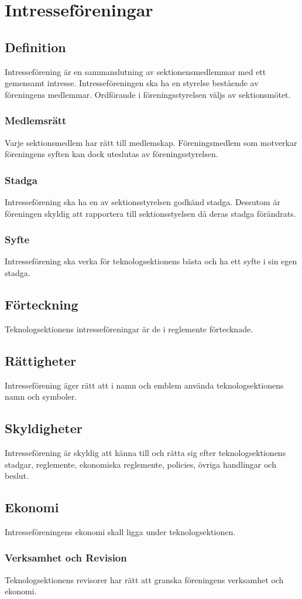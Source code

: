 \section{Intresseföreningar}
\subsection{Definition}
Intresseförening är en sammanslutning av sektionensmedlemmar med ett gemensamt intresse.
Intresseföreningen ska ha en styrelse bestående av föreningens medlemmar.
Ordförande i föreningsstyrelsen väljs av sektionsmötet.
\subsubsection{Medlemsrätt}
Varje sektionsmedlem har rätt till medlemskap.
Föreningsmedlem som motverkar föreningens syften kan dock uteslutas av föreningsstyrelsen.
\subsubsection{Stadga}
Intresseförening ska ha en av sektionsstyrelsen godkänd stadga.
Dessutom är föreningen skyldig att rapportera till sektionsstyelsen då deras stadga förändrats.
\subsubsection{Syfte}
Intresseförening ska verka för teknologsektionens bästa och ha ett syfte i sin egen stadga.
\subsection{Förteckning}
Teknologsektionens intresseföreningar är de i reglemente förtecknade.
\subsection{Rättigheter}
Intresseförening äger rätt att i namn och emblem använda teknologsektionens namn och symboler.
\subsection{Skyldigheter}
Intresseförening är skyldig att känna till och rätta sig efter teknologsektionens stadgar, reglemente, ekonomiska reglemente, policies, övriga handlingar och beslut.
\subsection{Ekonomi}
Intresseföreningens ekonomi skall ligga under teknologsektionen.
\subsubsection{Verksamhet och Revision}
Teknologsektionens revisorer har rätt att granska föreningens verksamhet och ekonomi.
